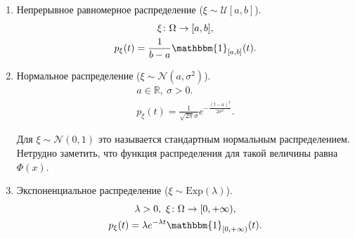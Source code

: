 \begin{examples}
\begin{enumerate}
            \item Непрерывное равномерное распределение ($\xi \sim \mathcal{U}[a, b]$).
            \begin{gather*}
                \xi \colon \Omega\rightarrow [a, b],\\
                p_\xi (t) = \frac{1}{b - a}\mathbbm{1}_{[a, b]}(t).
            \end{gather*}
   
            \item Нормальное распределение ($\xi\sim \mathcal{N}(a, \sigma^2)$).
            \begin{gather*}
                a\in\mathbb{R}, \ \sigma > 0.\\
                p_\xi (t) = \frac{1}{\sqrt{2\pi}\sigma} e^{-\frac{(t-a)^2}{2\sigma^2}}.
            \end{gather*}
   
                  Для $\xi\sim\mathcal{N}(0, 1)$ это называется стандартным нормальным распределением. Нетрудно заметить, что функция распределения для такой величины равна $\Phi(x)$.
   
            \item Экспоненциальное распределение ($\xi\sim \text{Exp}(\lambda)$).
            \begin{gather*}
                \lambda > 0, \ \xi \colon \Omega \rightarrow [0, +\infty), \\
                p_\xi (t) =\lambda e^{-\lambda t}\mathbbm{1}_{[0, +\infty)}(t).
            \end{gather*}
        \end{enumerate}
    \end{examples}
   
   \newpage
